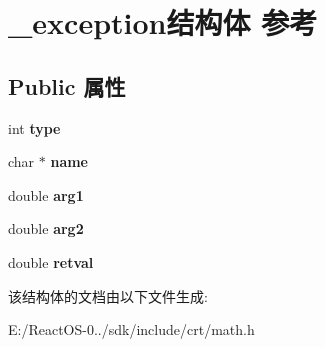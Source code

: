 \hypertarget{struct__exception}{}\section{\+\_\+exception结构体 参考}
\label{struct__exception}
\subsection*{Public 属性}
\begin{DoxyCompactItemize}
\item 
\mbox{\label{struct__exception_ae7e16e52fd0ae0d2851595705e2cd36e}} 
int {\bfseries type}
\item 
\mbox{\label{struct__exception_a7c662070ca40018ffc5378c67763cc7c}} 
char $\ast$ {\bfseries name}
\item 
\mbox{\label{struct__exception_afcda8a9850b5f5f3c4f1a20276416ab1}} 
double {\bfseries arg1}
\item 
\mbox{\label{struct__exception_a99b87d7f6b01d85c24a8b8e48d22d3b6}} 
double {\bfseries arg2}
\item 
\mbox{\label{struct__exception_a3b937292a7f76984d86b3656a8db4156}} 
double {\bfseries retval}
\end{DoxyCompactItemize}


该结构体的文档由以下文件生成\+:\begin{DoxyCompactItemize}
\item 
E\+:/\+React\+O\+S-\/0../sdk/include/crt/math.\+h\end{DoxyCompactItemize}
